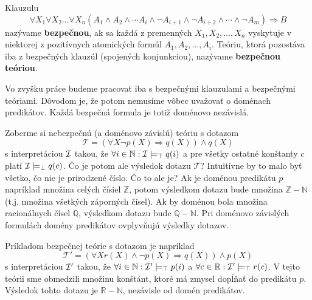\begin{definition}
Klauzulu 
$$\forall X_1 \forall X_2 \dots \forall X_n (A_1 \land A_2 \land \cdots A_i \land \lnot A_{i+1}
\land \lnot A_{i+2} \land \cdots \land \lnot A_m) \Rightarrow B$$ nazývame \textbf{bezpečnou}, ak sa
každá z premenných $X_1, X_2, \dots, X_n$ vyskytuje v niektorej z pozitívnych atomických formúl
$A_1, A_2, \dots, A_i$. Teóriu, ktorá pozostáva iba z bezpečných klauzúl (spojených konjunkciou), nazývame
\textbf{bezpečnou teóriou}.
\end{definition}

\begin{note}
Vo zvyšku práce budeme pracovať iba s bezpečnými klauzulami a bezpečnými teóriami. Dôvodom je, že
potom nemusíme vôbec uvažovať o doménach predikátov. Každá bezpečná formula je totiž doménovo nezávislá. 

Zoberme si nebezpečnú (a doménovo závislú) teóriu s dotazom 
$$\mathcal{T} = (\forall X \lnot p(X) \Rightarrow q(X)) \land q(X)$$ s interpretáciou $\mathcal{I}$
takou, že $\forall i \in \mathbb{N}: \mathcal{I} \models_\top q(i)$ a pre všetky ostatné konštanty $c$
platí $\mathcal{I} \models_\bot q(c)$. Čo je potom ale výsledok dotazu $\mathcal{T}$? Intuitívne by to
malo byť všetko, čo nie je prirodzené číslo. Čo to ale je? Ak je doménou predikátu $p$ napríklad
množina celých čísiel $\mathbb{Z}$, potom výsledkom dotazu bude množina $\mathbb{Z}-\mathbb{N}$
(t.j. množina všetkých záporných čísel). Ak by doménou bola množina racionálnych čísel $\mathbb{Q}$,
výsledkom dotazu bude $\mathbb{Q}-\mathbb{N}$. Pri doménovo závislých formulách domény predikátov
ovplyvňujú výsledky dotazov.
    
Príkladom bezpečnej teórie s dotazom je napríklad
$$\mathcal{T}' = (\forall X r(X) \land \lnot p(X) \Rightarrow q(X)) \land p(X)$$ s interpretáciou
$\mathcal{I}'$ takou, že $\forall i \in \mathbb{N}: \mathcal{I}' \models_\top p(i)$ a $\forall c \in
\mathbb{R}: \mathcal{I}' \models_\top r(c)$. V tejto teórii sme obmedzili množinu konštánt, ktoré má
zmysel dopĺňať do predikátu $p$. Výsledok tohto dotazu je $\mathbb{R}-\mathbb{N}$, nezávisle od
domén predikátov.
\end{note}